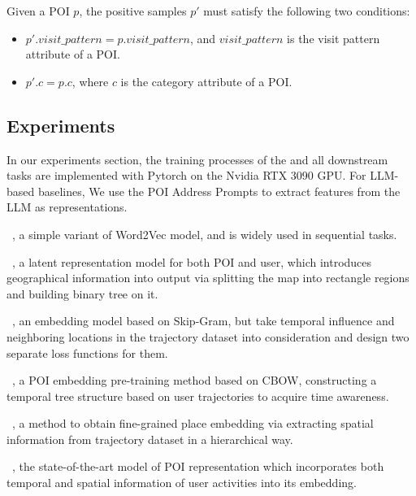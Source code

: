     
Given a POI $p$, the positive samples $p'$ must satisfy the following two conditions:
    \begin{itemize}
        \item $p'.visit \_pattern=p.visit\_pattern$, and $visit\_pattern$ is the visit pattern attribute of a POI.
        \item $p'.c=p.c$, where $c$ is the category attribute of a POI. 
    \end{itemize}

\subsection{Experiments}
In our experiments section, the training processes of the \name and all downstream tasks are implemented with Pytorch on the Nvidia RTX 3090 GPU. For LLM-based baselines, We use the POI Address Prompts to extract features from the LLM as representations.


~\cite{mikolov2013efficient}, a simple variant of Word2Vec model, and is widely used in sequential tasks.

~\cite{feng2017poi2vec}, a latent representation model for both POI and user, which introduces geographical information into output via splitting the map into rectangle regions and building binary tree on it.

~\cite{zhao2017geo}, an embedding model based on Skip-Gram, but take temporal influence and neighboring locations in the trajectory dataset into consideration and design two separate loss functions for them.

~\cite{wan2021pre}, a POI embedding pre-training method based on CBOW,  constructing a temporal tree structure based on user trajectories to acquire time awareness.

~\cite{shimizu2020enabling}, a method to obtain fine-grained place embedding via extracting spatial information from trajectory dataset in a hierarchical way.

~\cite{lin2021pre}, the state-of-the-art model of POI representation which incorporates both temporal and spatial information of user activities into its embedding.


